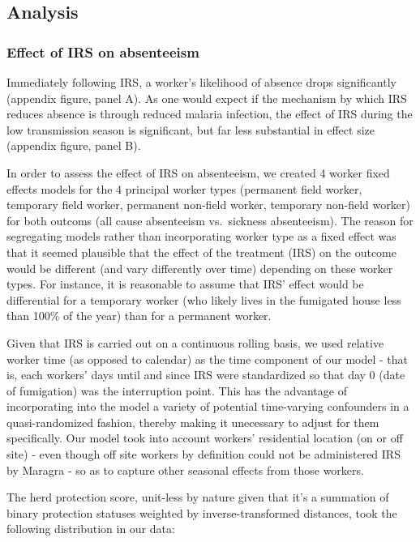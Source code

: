 \documentclass[]{article}
\begin{document}
\subsection{Analysis}\label{analysis}

\subsubsection{Effect of IRS on
absenteeism}\label{effect-of-irs-on-absenteeism}

Immediately following IRS, a worker's likelihood of absence drops
significantly (appendix figure, panel A). As one would expect if the
mechanism by which IRS reduces absence is through reduced malaria
infection, the effect of IRS during the low transmission season is
significant, but far less substantial in effect size (appendix figure,
panel B).

In order to assess the effect of IRS on absenteeism, we created 4 worker
fixed effects models for the 4 principal worker types (permanent field
worker, temporary field worker, permanent non-field worker, temporary
non-field worker) for both outcoms (all cause absenteeism vs.~sickness
absenteeism). The reason for segregating models rather than
incorporating worker type as a fixed effect was that it seemed plausible
that the effect of the treatment (IRS) on the outcome would be different
(and vary differently over time) depending on these worker types. For
instance, it is reasonable to assume that IRS' effect would be
differential for a temporary worker (who likely lives in the fumigated
house less than 100\% of the year) than for a permanent worker.

Given that IRS is carried out on a continuous rolling basis, we used
relative worker time (as opposed to calendar) as the time component of
our model - that is, each workers' days until and since IRS were
standardized so that day 0 (date of fumigation) was the interruption
point. This has the advantage of incorporating into the model a variety
of potential time-varying confounders in a quasi-randomized fashion,
thereby making it unecessary to adjust for them specifically. Our model
took into account workers' residential location (on or off site) - even
though off site workers by definition could not be administered IRS by
Maragra - so as to capture other seasonal effects from those workers.

The herd protection score, unit-less by nature given that it's a
summation of binary protection statuses weighted by inverse-transformed
distances, took the following distribution in our data:
\end{document}
